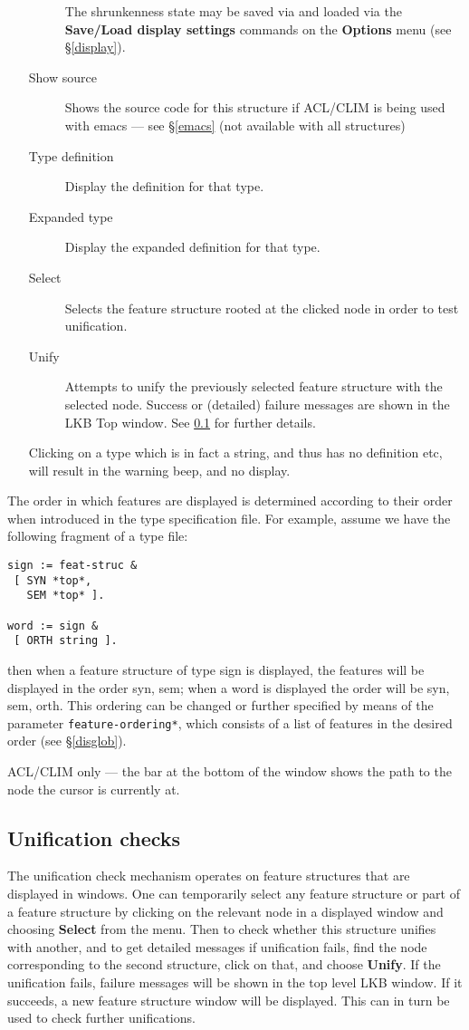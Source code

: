\documentclass[12pt]{report}
\newcommand{\lkbparam}[1]{{\tt #1}}
\newcommand{\lkbmenucommand}{\bf}
\begin{document}
\begin{enumerate}
\begin{description}
The shrunkenness state may be saved via and loaded via the
{\lkbmenucommand Save/Load display settings} commands on the {\lkbmenucommand Options} menu
(see \S\ref{display}).
\item [Show source] Shows the source code for this structure 
if ACL/CLIM is being used with emacs --- see \S\ref{emacs} (not available
with all structures)
\item[Type definition] 
Display the definition for that type.
\item[Expanded type]
Display the expanded definition for that type.
\item[Select]  Selects the
feature structure rooted at the clicked node in order to test unification.
\item[Unify] Attempts to unify the previously selected feature structure
with the selected node.  Success or (detailed) failure messages
are shown in the LKB Top window.  See \ref{unifcheck} for further
details.
\end{description}
Clicking on a type which is in fact a string, and thus has no
definition etc, will result in the warning beep, and no display.
\end{enumerate}

The order in which features are displayed is determined according to
their order when introduced in the type specification file.  For
example, assume we have the following fragment of a type file:
\begin{verbatim}
sign := feat-struc &
 [ SYN *top*, 
   SEM *top* ].

word := sign &
 [ ORTH string ].
\end{verbatim}
then when a feature structure of type {\type sign} is displayed, the
features will be displayed in the order {\feature syn}, {\feature sem}; when a {\type
word} is displayed the order will be {\feature syn}, {\feature sem}, {\feature orth}.
This ordering can be changed or further specified by
means of the parameter \lkbparam{*feature-ordering*}, which consists of
a list of features in the desired order (see \S\ref{disglob}).

ACL/CLIM only --- the bar at the bottom of the window shows the
path to the node the cursor is currently at.

\subsection{Unification checks}
\label{unifcheck}

The unification check mechanism operates on feature
structures that are displayed in windows.  One can
temporarily select any feature structure or part of a feature structure
by clicking on the relevant node in a displayed window and choosing
{\lkbmenucommand Select} from the menu.  Then to check whether this structure
unifies with another, and to get detailed messages if unification fails,
find the node corresponding to the second
structure, click on that, and choose {\lkbmenucommand Unify}.
If the unification fails, failure messages will be shown in the
top level LKB window.  If it succeeds, a new feature structure
window will be displayed.  This can in turn be used to check further
unifications.
\end{document}
